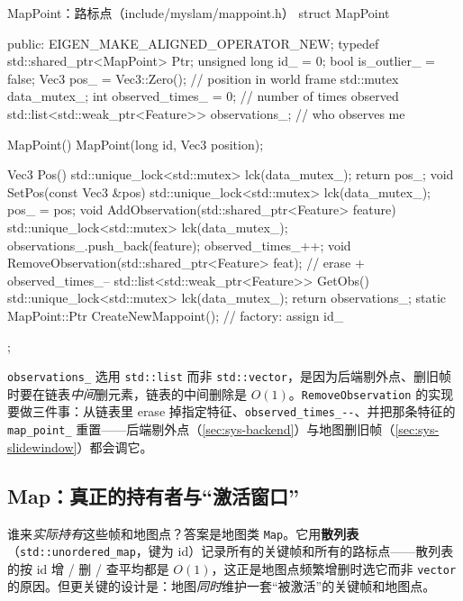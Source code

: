 \begin{codebox}[C++]{MapPoint：路标点（include/myslam/mappoint.h）}
struct MapPoint {
   public:
    EIGEN_MAKE_ALIGNED_OPERATOR_NEW;
    typedef std::shared_ptr<MapPoint> Ptr;
    unsigned long id_ = 0;
    bool is_outlier_ = false;
    Vec3 pos_ = Vec3::Zero();          // position in world frame
    std::mutex data_mutex_;
    int observed_times_ = 0;           // number of times observed
    std::list<std::weak_ptr<Feature>> observations_;  // who observes me

    MapPoint() {}
    MapPoint(long id, Vec3 position);

    Vec3 Pos() {
        std::unique_lock<std::mutex> lck(data_mutex_);
        return pos_;
    }
    void SetPos(const Vec3 &pos) {
        std::unique_lock<std::mutex> lck(data_mutex_);
        pos_ = pos;
    }
    void AddObservation(std::shared_ptr<Feature> feature) {
        std::unique_lock<std::mutex> lck(data_mutex_);
        observations_.push_back(feature);
        observed_times_++;
    }
    void RemoveObservation(std::shared_ptr<Feature> feat);  // erase + observed_times_--
    std::list<std::weak_ptr<Feature>> GetObs() {
        std::unique_lock<std::mutex> lck(data_mutex_);
        return observations_;
    }
    static MapPoint::Ptr CreateNewMappoint();   // factory: assign id_
};
\end{codebox}

\noindent \texttt{observations\_} 选用 \texttt{std::list} 而非 \texttt{std::vector}，是因为后端剔外点、删旧帧时要在链表\emph{中间}删元素，链表的中间删除是 $O(1)$。\texttt{RemoveObservation} 的实现要做三件事：从链表里 erase 掉指定特征、\texttt{observed\_times\_-{}-}、并把那条特征的 \texttt{map\_point\_} 重置——后端剔外点（\cref{sec:sys-backend}）与地图删旧帧（\cref{sec:sys-slidewindow}）都会调它。

\subsection{Map：真正的持有者与“激活窗口”}
\label{sec:sys-map}

谁来\emph{实际持有}这些帧和地图点？答案是地图类 \texttt{Map}。它用\textbf{散列表}（\texttt{std::unordered\_map}，键为 id）记录所有的关键帧和所有的路标点——散列表的按 id 增 / 删 / 查平均都是 $O(1)$，这正是地图点频繁增删时选它而非 \texttt{vector} 的原因。但更关键的设计是：地图\emph{同时}维护一套“被激活”的关键帧和地图点。

